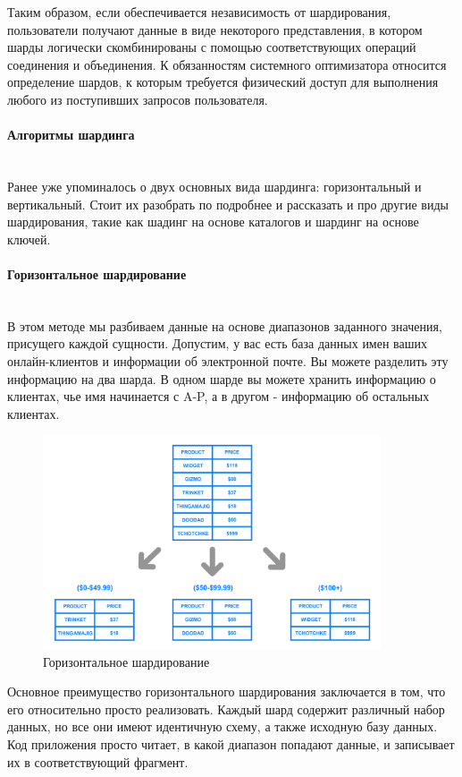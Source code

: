 Таким образом, если обеспечивается независимость от шардирования, пользователи получают данные в виде некоторого
представления, в котором шарды логически скомбинированы с помощью соответствующих операций соединения и объединения.
К обязанностям системного оптимизатора относится определение шардов, к которым требуется физический доступ для
выполнения любого из поступивших запросов пользователя. \autocite{IntroBD2014}

\paragraph{Алгоритмы шардинга} ~\\
Ранее уже упоминалось о двух основных вида шардинга: горизонтальный и вертикальный. Стоит их разобрать по подробнее и
рассказать и про другие виды шардирования, такие как шадинг на основе каталогов и шардинг на основе ключей.

\paragraph{Горизонтальное шардирование} ~\\
В этом методе мы разбиваем данные на основе диапазонов заданного значения, присущего каждой сущности. Допустим, у вас
есть база данных имен ваших онлайн-клиентов и информации об электронной почте. Вы можете разделить эту информацию на
два шарда. В одном шарде вы можете хранить информацию о клиентах, чье имя начинается с A-P, а в другом - информацию
об остальных клиентах.

\begin{figure}[H]
    \centering
    \includegraphics[width=100mm]{assets/distributed/Horizontal-Sharding}
    \caption{Горизонтальное шардирование}
    \label{fig:Horizontal-Sharding}
\end{figure}

Основное преимущество горизонтального шардирования заключается в том, что его относительно просто реализовать. Каждый
шард содержит различный набор данных, но все они имеют идентичную схему, а также исходную базу данных. Код приложения
просто читает, в какой диапазон попадают данные, и записывает их в соответствующий фрагмент.

